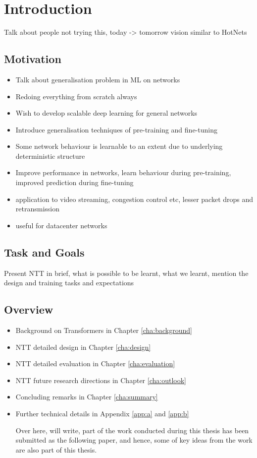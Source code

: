 \chapter{Introduction}
\label{cha:introduction}

Talk about people not trying this, today -> tomorrow vision similar to HotNets

\section{Motivation}
\label{sec:motivation}

\begin{itemize}
\item Talk about generalisation problem in ML on networks
\item Redoing everything from scratch always
\item Wish to develop scalable deep learning for general networks
\item Introduce generalisation techniques of pre-training and fine-tuning

\item Some network behaviour is learnable to an extent due to underlying deterministic structure 
\item Improve performance in networks, learn behaviour during pre-training, improved prediction during fine-tuning
\item application to video streaming, congestion control etc, lesser packet drops and retransmission 
\item useful for datacenter networks
\end{itemize}

\section{Task and Goals}
\label{sec:task}

Present NTT in brief, what is possible to be learnt, what we learnt, mention the design and training tasks and expectations 

\section{Overview}
\label{sec:overview}

\begin{itemize}
\item Background on Transformers in Chapter \ref{cha:background}
\item NTT detailed design in Chapter \ref{cha:design}
\item NTT detailed evaluation in Chapter \ref{cha:evaluation}
\item NTT future research directions in Chapter \ref{cha:outlook}
\item Concluding remarks in Chapter \ref{cha:summary}
\item Further technical details in  Appendix \ref{app:a} and  \ref{app:b} 

Over here, will write, part of the work conducted during this thesis has been submitted as the following paper\cite{newhope}, and hence, some of key ideas from the work are also part of this thesis.


\end{itemize}